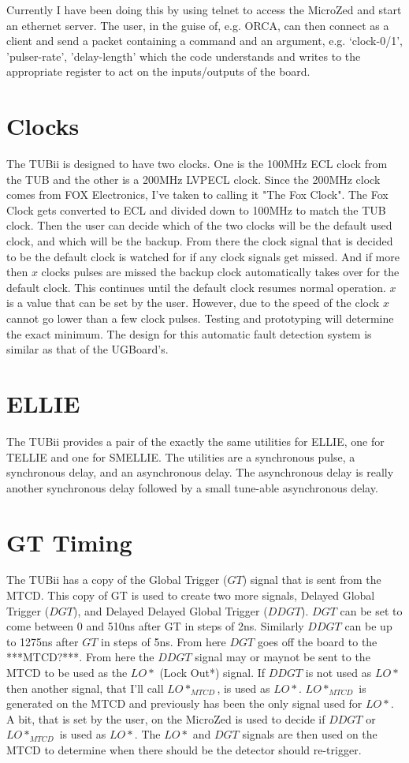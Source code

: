 \documentclass[11pt,a4paper]{article}
\begin{document}
Currently I have been doing this by using telnet to access the MicroZed and start an ethernet server. The user, in the guise of, e.g. ORCA, can then connect as a client and send a packet containing a command and an argument, e.g. `clock-0/1', 'pulser-rate', 'delay-length' which the code understands and writes to the appropriate register to act on the inputs/outputs of the board.

\section{Clocks}
The TUBii is designed to have two clocks. One is the 100MHz ECL clock from the TUB and the other is a 200MHz LVPECL clock. Since the 200MHz clock comes from FOX Electronics, I've taken to calling it "The Fox Clock". The Fox Clock gets converted to ECL and divided down to 100MHz to match the TUB clock. Then the user can decide which of the two clocks will be the default used clock, and which will be the backup. From there the clock signal that is decided to be the default clock is watched for if any clock signals get missed. And if more then $x$ clocks pulses are missed the backup clock automatically takes over for the default clock. This continues until the default clock resumes normal operation. $x$ is a value that can be set by the user. However, due to the speed of the clock $x$ cannot go lower than a few clock pulses. Testing and prototyping will determine the exact minimum. The design for this automatic fault detection system is similar as that of the UGBoard's.
\section{ELLIE}
The TUBii provides a pair of the exactly the same utilities for ELLIE, one for TELLIE and one for SMELLIE.
The utilities are a synchronous pulse, a synchronous delay, and an asynchronous delay.    The asynchronous delay is really another synchronous delay followed by a small tune-able asynchronous delay. 
\section{GT Timing}
\label{GTTiming}
The TUBii has a copy of the Global Trigger ($GT$) signal that is sent from the MTCD. This copy of GT is used to create two more signals, Delayed Global Trigger ($DGT$), and Delayed Delayed Global Trigger ($DDGT$). $DGT$ can be set to come between 0 and 510ns after GT in steps of 2ns. Similarly $DDGT$ can be up to 1275ns after $GT$ in steps of 5ns. From here $DGT$ goes off the board to the ***MTCD?***.  From here the $DDGT$ signal may or maynot be sent to the MTCD to be used as the $LO*$ (Lock Out*) signal. If $DDGT$ is not used as $LO*$ then another signal, that I'll call $LO*_{MTCD}$, is used as $LO*$. $LO*_{MTCD}$ is generated on the MTCD and previously has been the only signal used for $LO*$. A bit, that is set by the user, on the MicroZed is used to decide if $DDGT$ or $LO*_{MTCD}$ is used as $LO*$. 
The $LO*$ and $DGT$ signals are then used on the MTCD to determine when there should be the detector should re-trigger.
 
\end{document}

